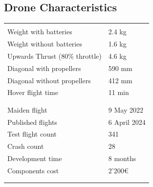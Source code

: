 \documentclass[conference]{IEEEtran}
\newcommand{\txtapprox}{\raisebox{0.5ex}{\texttildelow}}
\begin{document}
\subsection{Drone Characteristics}
\begin{tabular}{ l l }
	&\\[-8pt]  \hline  &\\[-8pt]
	Weight with batteries & 2.4 kg \\
	Weight without batteries & 1.6 kg \\
	Upwards Thrust (80\% throttle) & \txtapprox 4.6 kg \\
	Diagonal with propellers & 590 mm \\
	Diagonal without propellers & 412 mm \\
	Hover flight time & 11 min\\
	&\\[-8pt]  \hline  &\\[-7pt]
	Maiden flight & 9 May 2022\\
	Published flights & 6 April 2024\\
	Test flight count & 341\\
	Crash count & 28\\
	Development time & 8 months\\
	Components cost & 2'200€\\
	&\\[-8pt]  \hline &\\
\end{tabular}
\vspace{8pt}
\end{document}
